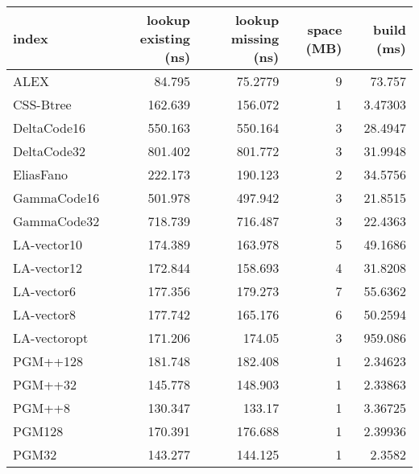\begin{tabular}{lrrrr}
\hline
 index             &   lookup existing (ns) &   lookup missing (ns) &   space (MB) &    build (ms) \\
\hline
 ALEX              &                84.795  &               75.2779 &            9 &  73.757       \\
 CSS-Btree         &               162.639  &              156.072  &            1 &   3.47303     \\
 DeltaCode16       &               550.163  &              550.164  &            3 &  28.4947      \\
 DeltaCode32       &               801.402  &              801.772  &            3 &  31.9948      \\
 EliasFano         &               222.173  &              190.123  &            2 &  34.5756      \\
 GammaCode16       &               501.978  &              497.942  &            3 &  21.8515      \\
 GammaCode32       &               718.739  &              716.487  &            3 &  22.4363      \\
 LA-vector10       &               174.389  &              163.978  &            5 &  49.1686      \\
 LA-vector12       &               172.844  &              158.693  &            4 &  31.8208      \\
 LA-vector6        &               177.356  &              179.273  &            7 &  55.6362      \\
 LA-vector8        &               177.742  &              165.176  &            6 &  50.2594      \\
 LA-vectoropt      &               171.206  &              174.05   &            3 & 959.086       \\
 PGM++128          &               181.748  &              182.408  &            1 &   2.34623     \\
 PGM++32           &               145.778  &              148.903  &            1 &   2.33863     \\
 PGM++8            &               130.347  &              133.17   &            1 &   3.36725     \\
 PGM128            &               170.391  &              176.688  &            1 &   2.39936     \\
 PGM32             &               143.277  &              144.125  &            1 &   2.3582      \\

\end{tabular}

